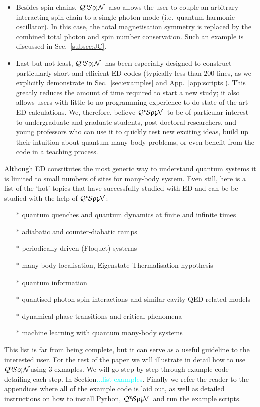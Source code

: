 \documentclass{SciPost}
\newcommand\0{\scalebox{-1}[1]{0}}
\newcommand{\qspin}{$\mathcal{Q}^{\mathrm{u}}\!\mathcal{S}\uprho\mathrm{\text{\textexclamdown}}\mathcal{N}$}
\newcommand*{\cyan}{\textcolor{cyan}}
\begin{document}
\begin{itemize}
	\item Besides spin chains, \qspin\ also allows the user to couple an arbitrary interacting spin chain to a single photon mode (i.e.~quantum harmonic oscillator). In this case, the total magnetisation symmetry is replaced by the combined total photon and spin number conservation. Such an example is discussed in Sec.~\ref{subsec:JC}.
	\item Last but not least, \qspin\ has been especially designed to construct particularly short and efficient ED codes (typically less than $200$ lines, as we explicitly demonstrate in Sec.~\ref{sec:examples} and App.~\ref{app:scripts}). This greatly reduces the amount of time required to start a new study; it also allows users with little-to-no programming experience to do state-of-the-art ED calculations. We, therefore, believe \qspin\ to be of particular interest to undergraduate and graduate students, post-doctoral researchers, and young professors who can use it to quickly test new exciting ideas, build up their intuition about quantum many-body problems, or even benefit from the code in a teaching process.
\end{itemize}

Although ED constitutes the most generic way to understand quantum systems it is limited to small numbers of sites for many-body system. Even still, here is a list of the `hot' topics that have successfully studied with ED and can be be studied with the help of \qspin:
\begin{itemize}
	\item[$\ast$] quantum quenches and quantum dynamics at finite and infinite times
	\item[$\ast$] adiabatic and counter-diabatic ramps 
	\item[$\ast$] periodically driven (Floquet) systems
	\item[$\ast$] many-body localisation, Eigenstate Thermalisation hypothesis
	\item[$\ast$] quantum information
	\item[$\ast$] quantised photon-spin interactions and similar cavity QED related models
	\item[$\ast$] dynamical phase transitions and critical phenomena
	\item[$\ast$] machine learning with quantum many-body systems
\end{itemize}
This list is far from being complete, but it can serve as a useful guideline to the interested user. For the rest of the paper we will illustrate in detail how to use \qspin using 3 exmaples. We will go step by step through example code detailing each step. In Section\cyan{...list examples}. Finally we refer the reader to the appendices where all of the example code is laid out, as well as detailed instructions on how to install Python, \qspin\, and run the example scripts. 
\end{document}
